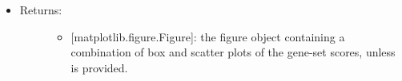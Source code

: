 \documentclass[letterpaper,10pt,english]{sphinxmanual}
\begin{document}
\begin{fulllineitems}
\begin{itemize}
\begin{description}
\begin{itemize}
\end{itemize}

\end{description}

\item {} \begin{description}
\item[{Returns:}] \leavevmode\begin{itemize}
\item {} 
{[}matplotlib.figure.Figure{]}: the figure object containing a
combination of box and scatter plots of the gene-set scores,
unless  is provided.

\end{itemize}

\end{description}

\end{itemize}

\end{fulllineitems}

\end{document}

